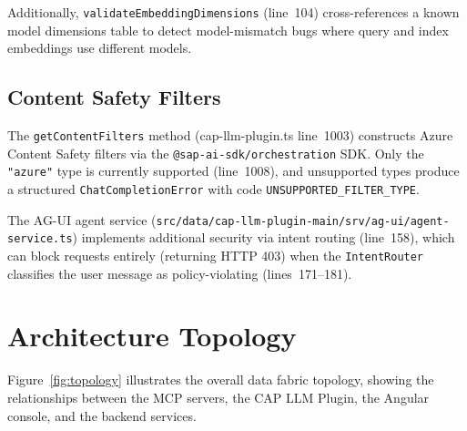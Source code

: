 \documentclass[11pt]{article}
\newcommand{\filepath}[1]{\texttt{#1}}
\newcommand{\code}[1]{\texttt{#1}}
\begin{document}
Additionally, \code{validateEmbeddingDimensions} (line~104) cross-references
a known model dimensions table to detect model-mismatch bugs where query
and index embeddings use different models.

\subsection{Content Safety Filters}

The \code{getContentFilters} method (cap-llm-plugin.ts line~1003)
constructs Azure Content Safety filters via the \code{@sap-ai-sdk/orchestration}
SDK.  Only the \code{"azure"} type is currently supported (line~1008),
and unsupported types produce a structured \code{ChatCompletionError}
with code \code{UNSUPPORTED\_FILTER\_TYPE}.

The AG-UI agent service (\filepath{src/data/cap-llm-plugin-main/srv/ag-ui/agent-service.ts})
implements additional security via intent routing (line~158), which can
block requests entirely (returning HTTP 403) when the \code{IntentRouter}
classifies the user message as policy-violating (lines~171--181).


\section{Architecture Topology}
\label{sec:topology}

Figure~\ref{fig:topology} illustrates the overall data fabric topology,
showing the relationships between the MCP servers, the CAP LLM Plugin,
the Angular console, and the backend services.
\end{document}
